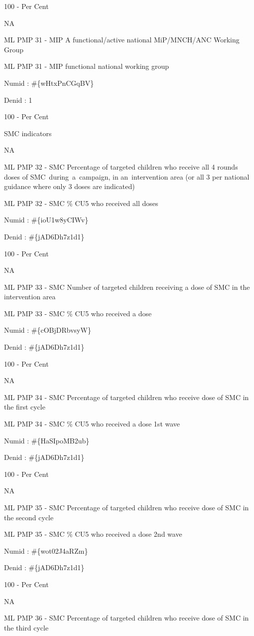 \documentclass[]{book}
\begin{document}
100 - Per Cent

NA

ML PMP 31 - MIP A functional/active national MiP/MNCH/ANC Working Group

ML PMP 31 - MIP functional national working group

Numid : \#\{wHtxPnCGqBV\}

Denid : 1

100 - Per Cent

SMC indicators

NA

ML PMP 32 - SMC Percentage of targeted children who receive all 4 rounds doses of SMC~during~a~campaign, in an~intervention area (or all 3 per national guidance where only 3 doses are indicated)

ML PMP 32 - SMC \% CU5 who received all doses

Numid : \#\{ioU1w8yCIWv\}

Denid : \#\{jAD6Dh7z1d1\}

100 - Per Cent

NA

ML PMP 33 - SMC Number of targeted children receiving a dose of SMC in the intervention area

ML PMP 33 - SMC \% CU5 who received a dose

Numid : \#\{cOBjDRbvsyW\}

Denid : \#\{jAD6Dh7z1d1\}

100 - Per Cent

NA

ML PMP 34 - SMC Percentage of targeted children who receive dose of SMC in the first cycle

ML PMP 34 - SMC \% CU5 who received a dose 1st wave

Numid : \#\{HaSIpoMB2ub\}

Denid : \#\{jAD6Dh7z1d1\}

100 - Per Cent

NA

ML PMP 35 - SMC Percentage of targeted children who receive dose of SMC in the second cycle

ML PMP 35 - SMC \% CU5 who received a dose 2nd wave

Numid : \#\{wot02J4aRZm\}

Denid : \#\{jAD6Dh7z1d1\}

100 - Per Cent

NA

ML PMP 36 - SMC Percentage of targeted children who receive dose of SMC in the third cycle
\end{document}
